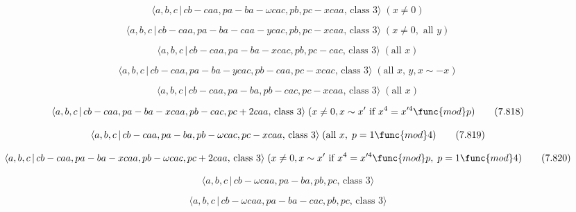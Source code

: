 \documentclass[10pt]{article}
\begin{document}
\begin{equation}
\langle a,b,c\,|\,cb-caa,pa-ba-\omega cac,pb,pc-xcaa,\,\text{class }3\rangle
\;(x\neq 0)  \tag{7.813}
\end{equation}

\begin{equation}
\langle a,b,c\,|\,cb-caa,pa-ba-caa-ycac,pb,pc-xcaa,\,\text{class }3\rangle
\;(x\neq 0,\text{ all }y)  \tag{7.814}
\end{equation}

\begin{equation}
\langle a,b,c\,|\,cb-caa,pa-ba-xcac,pb,pc-cac,\,\text{class }3\rangle \;(%
\text{all }x)  \tag{7.815}
\end{equation}

\begin{equation}
\langle a,b,c\,|\,cb-caa,pa-ba-ycac,pb-caa,pc-xcac,\,\text{class }3\rangle
\;(\text{all }x,\,y,x\sim -x)  \tag{7.816}
\end{equation}

\begin{equation}
\langle a,b,c\,|\,cb-caa,pa-ba,pb-cac,pc-xcaa,\,\text{class }3\rangle \;(%
\text{all }x)  \tag{7.817}
\end{equation}

\begin{equation}
\langle a,b,c\,|\,cb-caa,pa-ba-xcaa,pb-cac,pc+2caa,\,\text{class }3\rangle
\;(x \neq 0, x \sim x^{\prime}\text{ if }x^4=x^{\prime 4 }\func{mod} p) 
\tag{7.818}
\end{equation}

\begin{equation}
\langle a,b,c\,|\,cb-caa,pa-ba,pb-\omega cac,pc-xcaa,\,\text{class }3\rangle
\;(\text{all }x,\;p=1\func{mod}4)  \tag{7.819}
\end{equation}

\begin{equation}
\langle a,b,c\,|\,cb-caa,pa-ba-xcaa,pb-\omega cac,pc+2caa,\,\text{class }%
3\rangle \;(x\neq 0,x\sim x^{\prime}\text{ if }x^4=x^{\prime 4}\func{mod}%
p,\;p=1\func{mod}4)  \tag{7.820}
\end{equation}

\begin{equation}
\langle a,b,c\,|\,cb-\omega caa,pa-ba,pb,pc,\,\text{class }3\rangle 
\tag{7.821}
\end{equation}

\begin{equation}
\langle a,b,c\,|\,cb-\omega caa,pa-ba-cac,pb,pc,\,\text{class }3\rangle 
\tag{7.822}
\end{equation}
\end{document}
